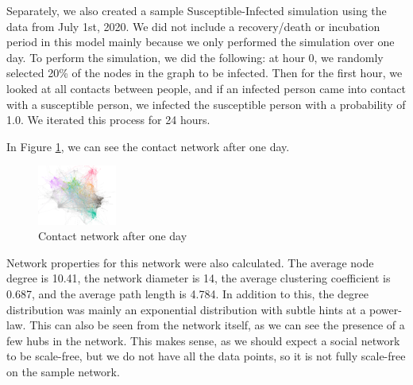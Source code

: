 \documentclass[times, 10pt,twocolumn]{article}
\begin{document}
Separately, we also created a sample Susceptible-Infected simulation using the data from July 1st, 2020. We did not include a recovery/death or incubation period in this model mainly because we only performed the simulation over one day. To perform the simulation, we did the following: at hour 0, we randomly selected 20\% of the nodes in the graph to be infected. Then for the first hour, we looked at all contacts between people, and if an infected person came into contact with a susceptible person, we infected the susceptible person with a probability of 1.0. We iterated this process for 24 hours.




In Figure \ref{fig:my_label}, we can see the contact network after one day.
\begin{figure}
    \centering
    \includegraphics[width=0.23\textwidth]{imgs/one_day_net.png}
    \caption{Contact network after one day}
    \label{fig:my_label}
\end{figure}
Network properties for this network were also calculated. The average node degree is 10.41, the network diameter is 14, the average clustering coefficient is 0.687, and the average path length is 4.784. In addition to this, the degree distribution was mainly an exponential distribution with subtle hints at a power-law. This can also be seen from the network itself, as we can see the presence of a few hubs in the network. This makes sense, as we should expect a social network to be scale-free, but we do not have all the data points, so it is not fully scale-free on the sample network.
\end{document}
